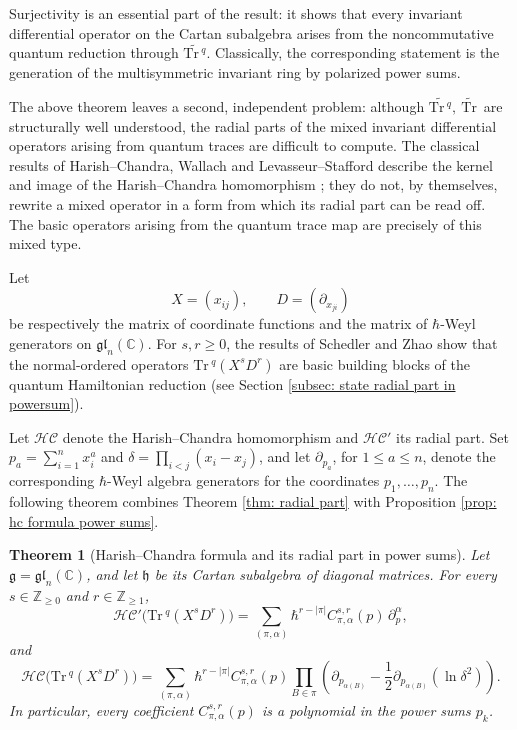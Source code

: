 \documentclass[11pt,reqno]{amsart}
\newtheorem{theorem}{Theorem}[section]
\theoremstyle{definition}
\newcommand{\bbC}{\mathbb{C}}
\newcommand{\bbZ}{\mathbb{Z}}
\newcommand{\gl}{\mathfrak{gl}}
\newcommand{\Tr}{\mathrm{Tr} \,}
\newcommand{\fkg}{\mathfrak{g}}
\newcommand{\fkh}{\mathfrak{h}}
\newcommand{\hc}{\mathcal{HC}}
\newcommand{\tTr}{\widetilde{\Tr}}
\begin{document}
Surjectivity is an essential part of the result: it shows that every invariant differential operator on the Cartan subalgebra arises from the noncommutative quantum reduction through \(\widetilde{\Tr ^q}\).
Classically, the corresponding statement is the generation of the multisymmetric invariant ring by polarized power sums.


The above theorem leaves a second, independent problem: although \(\widetilde{\Tr ^q},\ \tTr\) are structurally well understood, the radial parts of the mixed invariant differential operators arising from quantum traces are difficult to compute.
The classical results of
Harish--Chandra, Wallach and Levasseur--Stafford describe the kernel and image of the Harish--Chandra
homomorphism \cite{HC1957Dif,HC1964Inv,Wal1993Inv,LevSta1995Inv,LevSta1996Ker}; they do
not, by themselves, rewrite a mixed operator in a form from which its radial
part can be read off.  The basic operators arising from the quantum trace
map are precisely of this mixed type.

Let
\[
X=(x_{ij}),
\qquad
D=(\partial_{x_{ji}})
\]
be respectively the matrix of coordinate functions and the matrix of
\(\hbar\)-Weyl generators on \(\gl_n (\bbC)\).
For \(s,r\geq0\), the results of Schedler \cite{Sch2005} and Zhao \cite{Zhao2021Com,Zhao2023Non} show that the normal-ordered operators \(\Tr^q(X^s D^r)\) are basic building blocks of the quantum Hamiltonian reduction (see Section \ref{subsec: state radial part in powersum}).





Let $\hc$ denote the Harish--Chandra homomorphism and $\hc'$ its radial
part.  Set \(p_a=\sum_{i=1}^n x_i^a\) and
\(\delta=\prod_{i<j}(x_i-x_j)\), and 
let
\(\partial_{p_a}\), for \(1\leq a\leq n\), denote the corresponding
\(\hbar\)-Weyl algebra generators for the coordinates
\(p_1,\ldots,p_n\).
The following theorem combines Theorem \ref{thm: radial part}
with Proposition \ref{prop: hc formula power sums}.

\begin{theorem}[Harish--Chandra formula and its radial part in power sums]
\label{thm:intro-radial-formula}
Let \(\fkg=\gl_n(\bbC)\), and let \(\fkh\) be its Cartan subalgebra
of diagonal matrices. For every \(s\in\bbZ_{\geq0}\) and
\(r\in\bbZ_{\geq1}\),
\[
\hc'\bigl(\Tr^q(X^sD^r)\bigr)
=
\sum_{(\pi,\alpha)}
\hbar^{r-|\pi|}
C_{\pi,\alpha}^{s,r}(p)\,
\partial_p^\alpha,
\]
and
\[
\hc\bigl(\Tr^q(X^sD^r)\bigr)
=
\sum_{(\pi,\alpha)}
\hbar^{r-|\pi|}
C_{\pi,\alpha}^{s,r}(p)
\prod_{B\in\pi}
\left(
\partial_{p_{\alpha(B)}}
-
\frac12
\partial_{p_{\alpha(B)}}(\ln\delta^2)
\right).
\]
In particular, every
coefficient \(C_{\pi,\alpha}^{s,r}(p) \) is a polynomial in the power sums \(p_k\).
\end{theorem}
\end{document}
